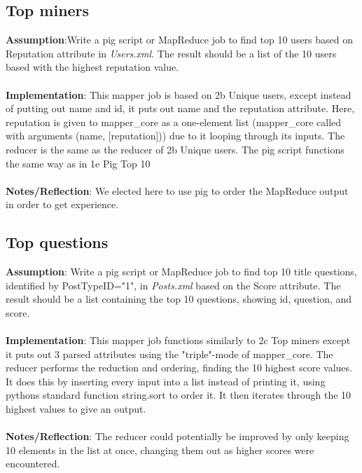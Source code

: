 \documentclass[fleqn,10pt]{wlscirep}
\begin{document}
\subsection{Top miners}
\textbf{Assumption}:Write a pig script or MapReduce job to find top 10 users based on Reputation attribute in \textit{Users.xml}. The result should be a list of the 10 users based with the highest reputation value. \\ \\
\textbf{Implementation}: This mapper job is based on 2b Unique users, except instead of putting out name and id, it puts out name and the reputation attribute. Here, reputation is given to mapper\_core as a one-element list (mapper\_core called with arguments (name, [reputation])) due to it looping through its inputs. The reducer is the same as the reducer of 2b Unique users. The pig script functions the same way as in 1e Pig Top 10\\ \\
\textbf{Notes/Reflection}: We elected here to use pig to order the MapReduce output in order to get experience.


\subsection{Top questions}
\textbf{Assumption}: Write a pig script or MapReduce job to find top 10 title questions, identified by PostTypeID="1", in \textit{Posts.xml} based on the Score attribute. The result should be a list containing the top 10 questions, showing id, question, and score.\\ \\
\textbf{Implementation}: This mapper job functions similarly to 2c Top miners except it puts out 3 parsed attributes using the "triple"-mode of mapper\_core. The reducer performs the reduction and ordering, finding the 10 highest score values. It does this by inserting every input into a list instead of printing it, using pythons standard function string.sort to order it. It then iterates through the 10 highest values to give an output.\\ \\
\textbf{Notes/Reflection}: The reducer could potentially be improved by only keeping 10 elements in the list at once, changing them out as higher scores were encountered.

\end{document}
